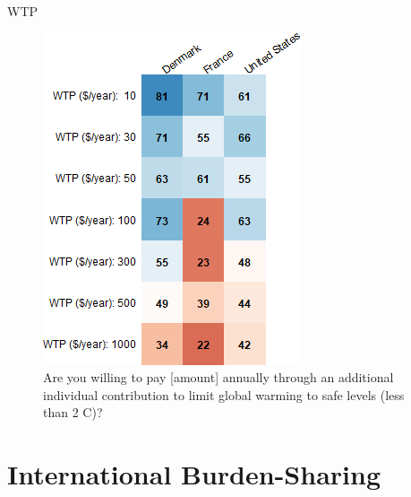 \documentclass[aspectratio=169,9pt,dvipsnames]{beamer}
\begin{document}
\begin{frame}{WTP}%
\begin{figure}[h!]
\centering
\caption{Are you willing to pay [amount] annually through an additional individual contribution to limit global warming to safe levels (less than 2 \degree{}C)?}
\includegraphics[width=.35\textwidth]{../figures/country_comparison/wtp_positive_countries.png} %
\end{figure}
\end{frame}


\section{International Burden-Sharing}

\end{document}

